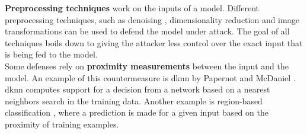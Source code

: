 \textbf{Preprocessing techniques} work on the inputs of a model. Different preprocessing techniques, such as denoising \cite{denoising}, dimensionality reduction \cite{dimensionality_reduction} and image transformations \cite{image_transformations} can be used to defend the model under attack. The goal of all techniques boils down to giving the attacker less control over the exact input that is being fed to the model.\\

Some defenses rely on \textbf{proximity measurements} between the input and the model. An example of this countermeasure is \gls{dknn} by Papernot and McDaniel \cite{dknn}. \gls{dknn} computes support for a decision from a network based on a nearest neighbors search in the training data. Another example is region-based classification \cite{region-based_classification}, where a prediction is made for a given input based on the proximity of training examples.\\ 

